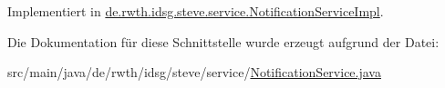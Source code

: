 Implementiert in \hyperlink{classde_1_1rwth_1_1idsg_1_1steve_1_1service_1_1_notification_service_impl_ab0deccea07cdc5c6c66f26ff4b1925cb}{de.\+rwth.\+idsg.\+steve.\+service.\+Notification\+Service\+Impl}.



Die Dokumentation für diese Schnittstelle wurde erzeugt aufgrund der Datei\+:\begin{DoxyCompactItemize}
\item 
src/main/java/de/rwth/idsg/steve/service/\hyperlink{_notification_service_8java}{Notification\+Service.\+java}\end{DoxyCompactItemize}
